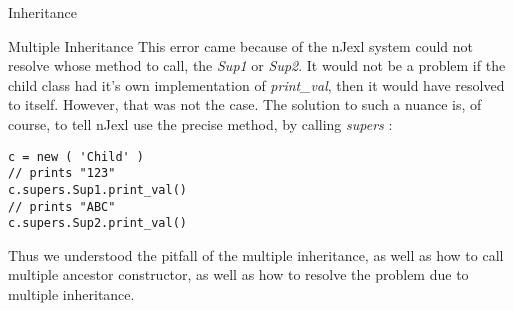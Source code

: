 \begin{section}{Inheritance}
\begin{subsection}{Multiple Inheritance}
This error came because of the nJexl system
could not resolve whose method to call, 
the \emph{Sup1} or \emph{Sup2}. It would not 
be a problem if the child class had it's 
own implementation of \emph{print\_val},
then it would have resolved to itself.
However, that was not the case.
The solution to such a nuance is, of course, 
to tell nJexl use the precise method, by calling 
\emph{supers} :

\begin{center}\begin{minipage}{\linewidth}
\begin{lstlisting}[style=JexlStyle]
c = new ( 'Child' )
// prints "123"
c.supers.Sup1.print_val()
// prints "ABC"
c.supers.Sup2.print_val()
\end{lstlisting}  
\end{minipage}\end{center}

Thus we understood the pitfall of the multiple inheritance,
as well as how to call multiple ancestor constructor, 
as well as how to resolve the problem due to multiple inheritance.

\end{subsection}

\end{section}

